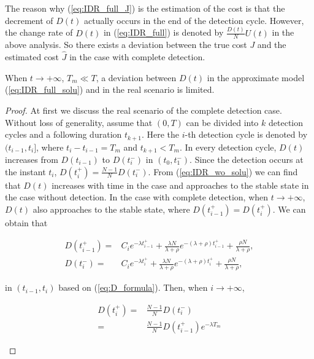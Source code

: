 The reason why (\ref{eq:IDR_full_J}) is the estimation of the cost
is that the decrement of $D(t)$ actually occurs in the end of the detection cycle.
However, the change rate of $D(t)$ in (\ref{eq:IDR_full})
is denoted by $\frac{D(t)}{N}U(t)$ in the above analysis.
So there exists a deviation between the true cost $J$ and
the estimated cost $\hat{J}$ in the case with complete detection.
\begin{lem}\label{lem:Dstable}
When $t \rightarrow +\infty$, $T_{m} \ll T$,
a deviation between $D(t)$ in the approximate model (\ref{eq:IDR_full_solu})
and in the real scenario is limited.
\end{lem}
\begin{proof}
At first we discuss the real scenario of the complete detection case.
Without loss of generality,
assume that $(0, T)$ can be divided into $k$ detection cycles
and a following duration $t_{k+1}$.
Here the $i$-th detection cycle is denoted by $(t_{i-1}, t_{i}]$,
where $t_{i} - t_{i-1} = T_{m}$ and $t_{k+1} < T_{m}$.
In every detection cycle,
$D(t)$ increases from $D(t_{i-1})$ to $D(t_{i}^{-})$
in $(t_{0}, t_{1}^{-})$.
Since the detection occurs at the instant $t_{i}$,
$D(t_{i}^{+}) = \frac{N-1}{N}D(t_{i}^{-})$.
From (\ref{eq:IDR_wo_solu}) we can find that $D(t)$ increases with time in the case
and approaches to the stable state in the case without detection.
In the case with complete detection,
when $t \rightarrow +\infty$,
$D(t)$ also approaches to the stable state,
where $D(t_{i-1}^{+}) = D(t_{i}^{+})$.
We can obtain that
\begin{small}
\begin{equation}
\nonumber
\begin{aligned}
D(t_{i-1}^{+}) = & C_{i} e^{-\lambda t_{i-1}^{+}}
+ \frac{\lambda N}{\lambda + \rho} e^{-(\lambda+\rho)t_{i-1}^{+}}
+ \frac{\rho N}{\lambda+\rho}, \\
D(t_{i}^{-}) = & C_{i} e^{-\lambda t_{i}^{+}}
+ \frac{\lambda N}{\lambda + \rho} e^{-(\lambda+\rho)t_{i}^{+}}
+ \frac{\rho N}{\lambda+\rho},
\end{aligned}
\end{equation}
\end{small}
in $(t_{i-1}, t_{i})$ based on (\ref{eq:D_formula}).
Then, when $i \rightarrow +\infty$,
\begin{small}
\begin{equation}
\nonumber
\begin{aligned}
D(t_{i}^{+}) =& \frac{N-1}{N} D(t_{i}^{-}) \\
=& \frac{N-1}{N} D(t_{i-1}^{+}) e^{-\lambda T_{m}}

\end{aligned}
\end{equation}
\end{small}
\end{proof}
